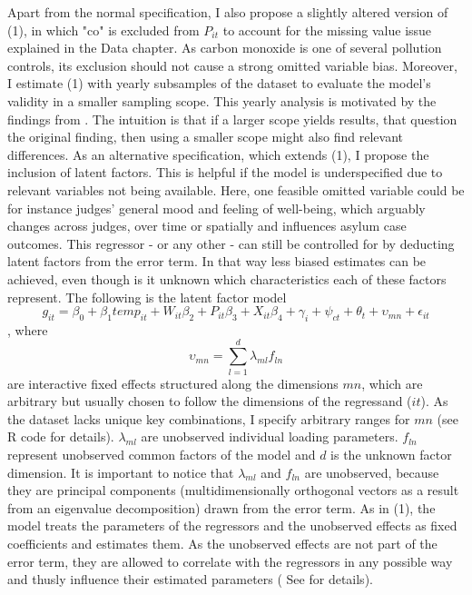 \documentclass[11pt]{article}
\begin{document}
	\newline Apart from the normal specification, I also propose a slightly altered version of (1), in which "co" is excluded from \(P_{it}\) to account for the missing value issue explained in the Data chapter. As carbon monoxide is one of several pollution controls, its exclusion should not cause a strong omitted variable bias. Moreover, I estimate (1) with yearly subsamples of the dataset to evaluate the model's validity in a smaller sampling scope. This yearly analysis is motivated by the findings from \cite{Spamann.2020}. The intuition is that if a larger scope yields  results, that question the original finding, then using a smaller scope might also find relevant differences.
	\newline As an alternative specification, which extends (1), I propose the inclusion of latent factors. This is helpful if the model is underspecified due to relevant variables not being available. Here, one feasible omitted variable could be for instance judges' general mood and feeling of well-being, which arguably changes across judges, over time or spatially and influences asylum case outcomes. This regressor - or any other - can still be controlled for by deducting latent factors from the error term. In that way less biased estimates can be achieved, even though is it unknown which characteristics each of these factors represent. The following is the latent factor model
	\begin{equation}
		g_{ it } = \beta_{0} + \beta_{1 }temp_{it} + W_{it}\beta_{2} + P_{it}\beta_{3} + X_{it}\beta_{4} + \gamma_{i} + \psi_{ct} + \theta_{t} + \upsilon_{mn} + \epsilon_{it}
	\end{equation}
	, where 
	\begin{equation}
		\upsilon_{mn} = \sum_{l=1}^d \lambda_{ ml } f_{ ln }
	\end{equation}
	are interactive fixed effects structured along the dimensions \(mn\), which are arbitrary but  usually chosen to follow the dimensions of the regressand (\(it\)). As the dataset lacks unique key combinations, I specify arbitrary ranges for \(mn\) (see R code for details). \(\lambda_{ ml }\) are unobserved individual loading parameters. \(f_{ ln }\) represent unobserved common factors of the model and  \(d\) is the unknown factor dimension. It is important to notice that  \(\lambda_{ ml }\) and \(f_{ ln }\) are  unobserved, because they are principal components (multidimensionally orthogonal vectors as a result from an eigenvalue decomposition) drawn from the error term. As  in (1), the model treats the parameters of the regressors and the unobserved effects as fixed coefficients and estimates them. As the unobserved effects are not part of the error term, they are allowed to correlate with the regressors in any possible way and thusly influence their estimated parameters ( See \cite{bai2009panel} for details).
\end{document}
